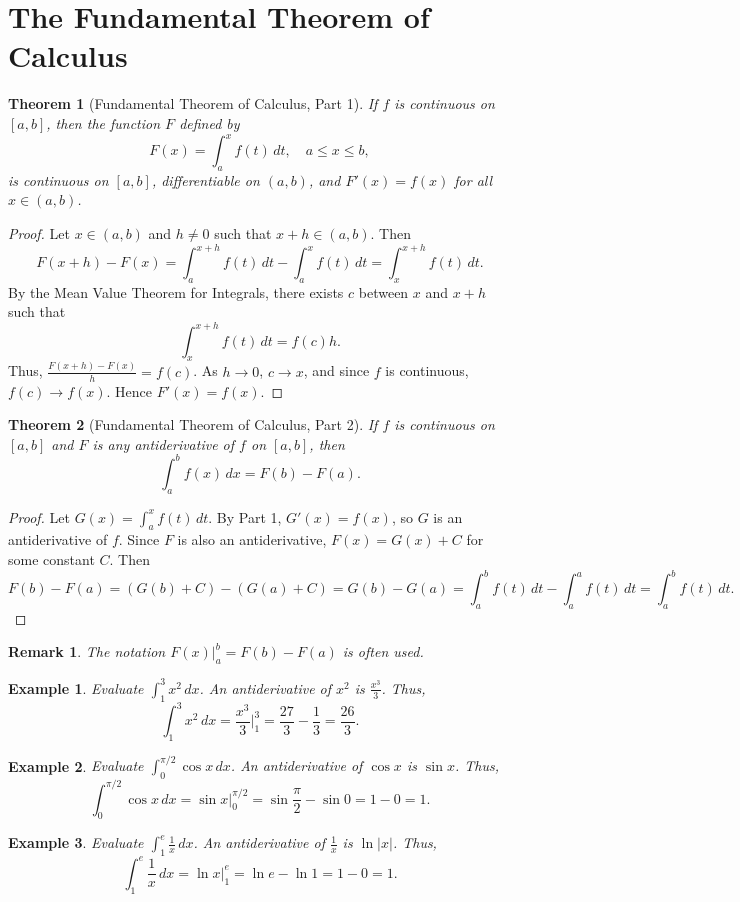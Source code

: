 \documentclass[11pt,a4paper]{article}
\newtheorem{example}{Example}
\newtheorem{theorem}{Theorem}
\newtheorem{remark}{Remark}
\begin{document}
\section{The Fundamental Theorem of Calculus}
\begin{theorem}[Fundamental Theorem of Calculus, Part 1]
If $f$ is continuous on $[a, b]$, then the function $F$ defined by
\[
F(x) = \int_a^x f(t) \, dt, \quad a \leq x \leq b,
\]
is continuous on $[a, b]$, differentiable on $(a, b)$, and $F'(x) = f(x)$ for all $x \in (a, b)$.
\end{theorem}
\begin{proof}
Let $x \in (a, b)$ and $h \neq 0$ such that $x + h \in (a, b)$. Then
\[
F(x + h) - F(x) = \int_a^{x+h} f(t) \, dt - \int_a^x f(t) \, dt = \int_x^{x+h} f(t) \, dt.
\]
By the Mean Value Theorem for Integrals, there exists $c$ between $x$ and $x+h$ such that
\[
\int_x^{x+h} f(t) \, dt = f(c) h.
\]
Thus, $\frac{F(x+h) - F(x)}{h} = f(c)$. As $h \to 0$, $c \to x$, and since $f$ is continuous, $f(c) \to f(x)$. Hence $F'(x) = f(x)$.
\end{proof}
\begin{theorem}[Fundamental Theorem of Calculus, Part 2]
If $f$ is continuous on $[a, b]$ and $F$ is any antiderivative of $f$ on $[a, b]$, then
\[
\int_a^b f(x) \, dx = F(b) - F(a).
\]
\end{theorem}
\begin{proof}
Let $G(x) = \int_a^x f(t) \, dt$. By Part 1, $G'(x) = f(x)$, so $G$ is an antiderivative of $f$. Since $F$ is also an antiderivative, $F(x) = G(x) + C$ for some constant $C$. Then
\[
F(b) - F(a) = (G(b) + C) - (G(a) + C) = G(b) - G(a) = \int_a^b f(t) \, dt - \int_a^a f(t) \, dt = \int_a^b f(t) \, dt.
\]
\end{proof}
\begin{remark}
The notation $F(x) \Big|_a^b = F(b) - F(a)$ is often used.
\end{remark}
\begin{example}
Evaluate $\displaystyle \int_1^3 x^2 \, dx$.
An antiderivative of $x^2$ is $\frac{x^3}{3}$. Thus,
\[
\int_1^3 x^2 \, dx = \frac{x^3}{3} \Big|_1^3 = \frac{27}{3} - \frac{1}{3} = \frac{26}{3}.
\]
\end{example}
\begin{example}
Evaluate $\displaystyle \int_0^{\pi/2} \cos x \, dx$.
An antiderivative of $\cos x$ is $\sin x$. Thus,
\[
\int_0^{\pi/2} \cos x \, dx = \sin x \Big|_0^{\pi/2} = \sin\frac{\pi}{2} - \sin 0 = 1 - 0 = 1.
\]
\end{example}
\begin{example}
Evaluate $\displaystyle \int_1^e \frac{1}{x} \, dx$.
An antiderivative of $\frac{1}{x}$ is $\ln|x|$. Thus,
\[
\int_1^e \frac{1}{x} \, dx = \ln x \Big|_1^e = \ln e - \ln 1 = 1 - 0 = 1.
\]
\end{example}
\end{document}
